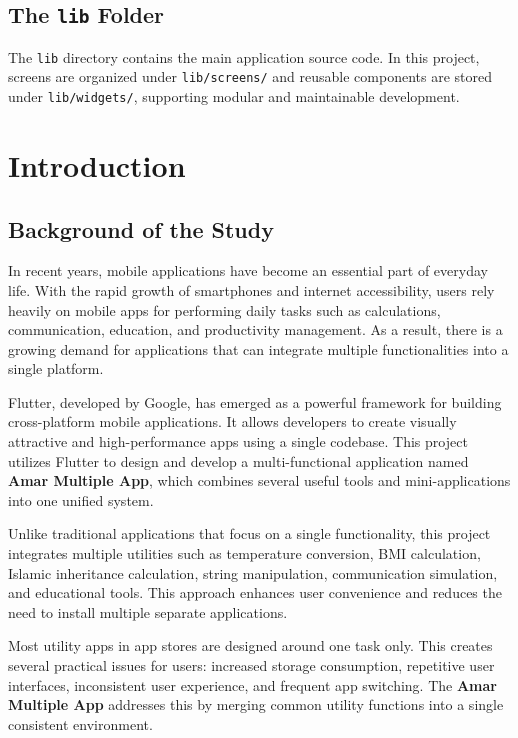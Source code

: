 \documentclass{article}
\begin{document}
\subsection{The \texttt{lib} Folder}
The \texttt{lib} directory contains the main application source code. In this project, screens are organized under \texttt{lib/screens/} and reusable components are stored under \texttt{lib/widgets/}, supporting modular and maintainable development.


\section{Introduction}

\subsection{Background of the Study}

In recent years, mobile applications have become an essential part of everyday life. With the rapid growth of smartphones and internet accessibility, users rely heavily on mobile apps for performing daily tasks such as calculations, communication, education, and productivity management. As a result, there is a growing demand for applications that can integrate multiple functionalities into a single platform.

Flutter, developed by Google, has emerged as a powerful framework for building cross-platform mobile applications. It allows developers to create visually attractive and high-performance apps using a single codebase. This project utilizes Flutter to design and develop a multi-functional application named \textbf{Amar Multiple App}, which combines several useful tools and mini-applications into one unified system.

Unlike traditional applications that focus on a single functionality, this project integrates multiple utilities such as temperature conversion, BMI calculation, Islamic inheritance calculation, string manipulation, communication simulation, and educational tools. This approach enhances user convenience and reduces the need to install multiple separate applications.

\begin{reportbox}
Most utility apps in app stores are designed around one task only. This creates several practical issues for users: increased storage consumption, repetitive user interfaces, inconsistent user experience, and frequent app switching. The \textbf{Amar Multiple App} addresses this by merging common utility functions into a single consistent environment.
\end{reportbox}
\end{document}
